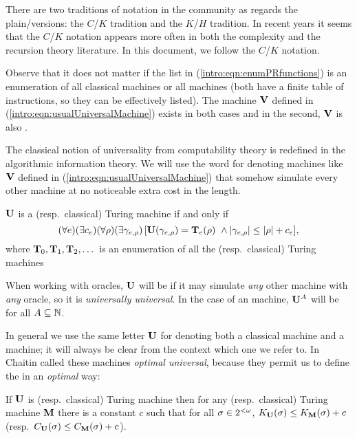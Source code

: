 There are two traditions of notation in the \kolcomp community as
regards the plain/\pfree versions: the $C$/$K$ tradition and the
$K$/$H$ tradition. In recent years it seems that the $C$/$K$
notation appears more often in both the complexity and the
recursion theory literature. In this document, we follow the
$C$/$K$ notation.

\bigskip

Observe that it does not matter if the list in
(\ref{intro:eqn:enumPRfunctions}) is an enumeration of all
classical machines or all \pfree machines (both have a finite
table of instructions, so they can be effectively listed). The
machine ${\bf V}$ defined in (\ref{intro:eqn:usualUniversalMachine})
exists in both cases and in the second, ${\bf V}$ is also \pfree.


The classical notion of universality from computability theory is
redefined in the algorithmic information theory. We will use the
word {\em \opt} for denoting machines like ${\bf V}$ defined in
(\ref{intro:eqn:usualUniversalMachine}) that somehow simulate
every other machine at no noticeable extra cost in the length.

\begin{definicion}[\Optity]\label{intro:def:optimal}
 ${\bf U}$ is a {\em \opt} \pfree
(resp.\ classical) Turing machine if and only if
$$
(\forall e)(\exists c_e)(\forall \rho)(\exists \gamma_{e,\rho})\,
[{\bf U}(\gamma_{e,\rho})={\bf T}_e(\rho) \ \wedge | \gamma_{e,\rho} |\leq
| \rho |+c_e],
$$
where ${\bf T}_0,{\bf T}_1,{\bf T}_2,\dots$ is an enumeration of all the \pfree
(resp.\ classical) Turing machines
\end{definicion}

When working with oracles, ${\bf U}$ will be \opt if it may simulate
{\em any} other machine with {\em any} oracle, so it is {\em
universally universal}. In the case of an \pfree \opt machine,
${\bf U}^A$ will be \pfree for all $A\subseteq\mathbb{N}$.

In general we use the same letter ${\bf U}$ for denoting both a
classical \opt machine and a \pfree \opt machine; it will always
be clear from the context which one we refer to. In~\cite{chaitin1975theory}
Chaitin called these machines {\em optimal universal}, because
they permit us to define the \kolcomp in an {\em optimal} way:

\begin{teorema}[Invariance]\label{intro:thm:invariance}
 If ${\bf U}$ is \opt \pfree (resp.\
classical) Turing machine then for any \pfree (resp.\ classical)
Turing machine ${\bf M}$ there is a constant $c$ such that for all
$\sigma\in2^{<\omega}$, $K_{{\bf U}}(\sigma)\leq K_{{\bf M}}(\sigma)+c$ (resp.\
$C_{{\bf U}}(\sigma)\leq C_{{\bf M}}(\sigma)+c$).
\end{teorema}

